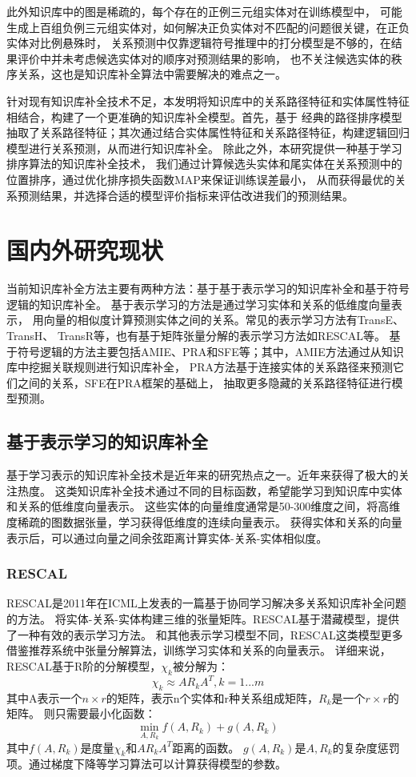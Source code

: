 此外知识库中的图是稀疏的，每个存在的正例三元组实体对在训练模型中，
可能生成上百组负例三元组实体对，如何解决正负实体对不匹配的问题很关键，在正负实体对比例悬殊时，
关系预测中仅靠逻辑符号推理中的打分模型是不够的，在结果评价中并未考虑候选实体对的顺序对预测结果的影响，
也不关注候选实体的秩序关系，这也是知识库补全算法中需要解决的难点之一。

针对现有知识库补全技术不足，本发明将知识库中的关系路径特征和实体属性特征相结合，构建了一个更准确的知识库补全模型。首先，基于 经典的路径排序模型抽取了关系路径特征；其次通过结合实体属性特征和关系路径特征，构建逻辑回归模型进行关系预测，从而进行知识库补全。
除此之外，本研究提供一种基于学习排序算法的知识库补全技术，
我们通过计算候选头实体和尾实体在关系预测中的位置排序，通过优化排序损失函数MAP来保证训练误差最小，
从而获得最优的关系预测结果，并选择合适的模型评价指标来评估改进我们的预测结果。

\chapter{国内外研究现状}
\label{cha:relatedwork}
当前知识库补全方法主要有两种方法：基于基于表示学习的知识库补全和基于符号逻辑的知识库补全。
基于表示学习的方法是通过学习实体和关系的低维度向量表示，
用向量的相似度计算预测实体之间的关系。常见的表示学习方法有TransE\cite{NIPS2013_5071}、TransH\cite{Wang2014KnowledgeGE}、
TransR\cite{Huang2017ImprovedKB}等，也有基于矩阵张量分解的表示学习方法如RESCAL\cite{Nickel2011}等。
基于符号逻辑的方法主要包括AMIE\cite{Galrraga2013AMIEAR}、PRA\cite{Lao2010}和SFE\cite{Gardner2015}等；其中，AMIE方法通过从知识库中挖掘关联规则进行知识库补全，
PRA方法基于连接实体的关系路径来预测它们之间的关系，SFE在PRA框架的基础上，
抽取更多隐藏的关系路径特征进行模型预测。

\section{基于表示学习的知识库补全}
\label{cha:presentation}
基于学习表示的知识库补全技术是近年来的研究热点之一。近年来获得了极大的关注热度。
这类知识库补全技术通过不同的目标函数，希望能学习到知识库中实体和关系的低维度向量表示。
这些实体的向量维度通常是50-300维度之间，将高维度稀疏的图数据张量，学习获得低维度的连续向量表示。
获得实体和关系的向量表示后，可以通过向量之间余弦距离计算实体-关系-实体相似度。

\subsection{RESCAL}
RESCAL是2011年在ICML上发表的一篇基于协同学习解决多关系知识库补全问题的方法。
将实体-关系-实体构建三维的张量矩阵。RESCAL基于潜藏模型，提供了一种有效的表示学习方法。
和其他表示学习模型不同，RESCAL这类模型更多借鉴推荐系统中张量分解算法，训练学习实体和关系的向量表示。
详细来说，RESCAL基于R阶的分解模型，$\chi_k$被分解为：
$$\chi_k \approx AR_{k}A^T, k =1...m$$
其中A表示一个$n\times r$的矩阵，表示n个实体和r种关系组成矩阵，$R_{k}$是一个$r\times r$的矩阵。
则只需要最小化函数：
$$\min \limits_{A,R_k} f(A,R_k)+g(A,R_k)$$
其中$f(A,R_k)$是度量$\chi_k$和$AR_{k}A^T$距离的函数。
$g(A,R_k)$是$A,R_k$的复杂度惩罚项。通过梯度下降等学习算法可以计算获得模型的参数。


